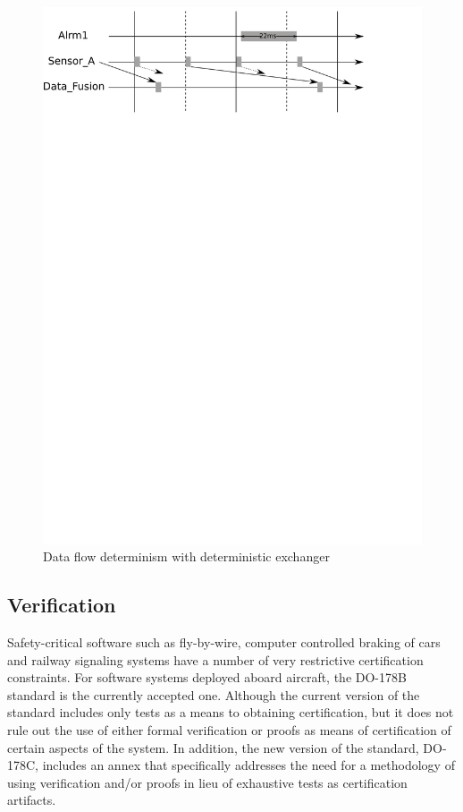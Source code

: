 \begin{figure}
\includegraphics[scale=0.75]{figs/control_simple_nobreach}
\caption{Data flow determinism with deterministic exchanger}
\label{fig:det_no_breach}
\end{figure}

\subsection{Verification}
\label{sec:verif}
Safety-critical software such as fly-by-wire, computer controlled
braking of cars and railway signaling systems have a number of very
restrictive certification constraints. For software systems deployed
aboard aircraft, the DO-178B standard is the currently accepted
one. Although the current version of the standard includes only tests
as a means to obtaining certification, but it does not rule out the
use of either formal verification or proofs as means of certification
of certain aspects of the system. In addition, the new version of the
standard, DO-178C, includes an annex that specifically addresses the
need for a methodology of using verification and/or proofs in lieu of
exhaustive tests as certification artifacts.

